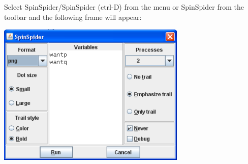 \documentclass[11pt]{article}
\newcommand{\bu}[1]{\textsf{#1}}
\begin{document}
Select \bu{SpinSpider/SpinSpider} (\bu{ctrl-D}) from the menu or \bu{SpinSpider}
from the toolbar and the following frame will appear:
\begin{center}
\includegraphics[width=9cm,keepaspectratio=true]{spd.png}
\end{center}
\end{document}
